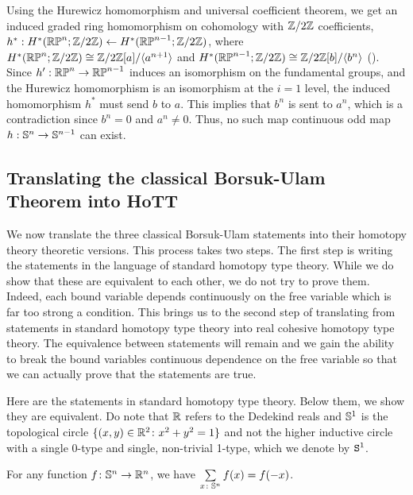 \documentclass{amsart}
\begin{document}
Using the Hurewicz homomorphism and universal coefficient theorem, we
get an induced graded ring homomorphism on cohomology with $\ZZtwo$
coefficients,
$h^*:H^*(\RRP^n;\ZZtwo)\leftarrow H^*(\RRP^{n-1};\ZZtwo)$, where
$H^*(\RRP^n;\ZZtwo)\cong \ZZtwo[a]/\langle a^{n+1}\rangle$ and
$H^*(\RRP^{n-1};\ZZtwo)\cong \ZZtwo[b]/\langle b^n\rangle$
().  Since
$h':\RRP^n\rightarrow\RRP^{n-1}$ induces an isomorphism on the
fundamental groups, and the Hurewicz homomorphism is an isomorphism at
the $i=1$ level, the induced homomorphism $h^*$ must send $b$ to
$a$. This implies that $b^n$ is sent to $a^n$, which is a
contradiction since $b^n=0$ and $a^n\neq 0$.  Thus, no such map
continuous odd map $h:\SS^n \rightarrow \SS^{n-1}$ can exist.

\subsection{Translating the classical Borsuk-Ulam Theorem into HoTT}

We now translate the three classical Borsuk-Ulam statements into their
homotopy theory theoretic versions. This process takes two steps.  The
first step is writing the statements in the language of standard
homotopy type theory. While we do show that these are equivalent to
each other, we do not try to prove them. Indeed, each bound variable
depends continuously on the free variable which is far too strong a
condition. This brings us to the second step of translating from
statements in standard homotopy type theory into real cohesive
homotopy type theory. The equivalence between statements will remain
and we gain the ability to break the bound variables continuous
dependence on the free variable so that we can actually prove that the
statements are true.

Here are the statements in standard homotopy type theory.  Below them,
we show they are equivalent. Do note that $\RR$ refers to the Dedekind
reals and $\SS^1$ is the topological circle
$\{ (x,y) \in \RR^2 \from x^2+y^2=1\}$ and not the higher inductive
circle with a single 0-type and single, non-trivial 1-type, which we
denote by $\S^1$.

\begin{statement}\label{BUClassic-HoTT}
  For any function $f \from \SS^n \to \RR^n$, we have
  $\sum\limits_{x \tin \SS^n} f(x) = f(-x)$.
\end{statement}
\end{document}
